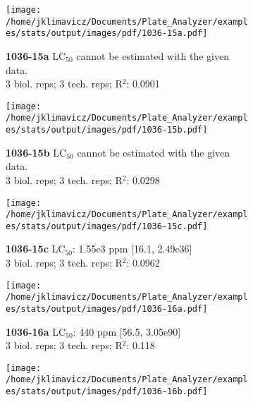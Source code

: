\documentclass{article}
\author{James Klimavicz}
\date{\today}
\begin{document}
\begin{figure}[thp!]
   \begin{subfigure}{0.500\textwidth}
      \centering
      \texttt{[image: /home/jklimavicz/Documents/Plate\_Analyzer/examples/stats/output/images/pdf/1036-15a.pdf]}
      \vspace{-0.05cm}
      \caption*{\textbf{1036-15a} LC$_{50}$ cannot be estimated with the given data. \\ 
3 biol. reps; 3 tech. reps; R$^2$: 0.0901}
      \vspace{0.1cm}
   \end{subfigure}%
   \begin{subfigure}{0.500\textwidth}
      \centering
      \texttt{[image: /home/jklimavicz/Documents/Plate\_Analyzer/examples/stats/output/images/pdf/1036-15b.pdf]}
      \vspace{-0.05cm}
      \caption*{\textbf{1036-15b} LC$_{50}$ cannot be estimated with the given data. \\ 
3 biol. reps; 3 tech. reps; R$^2$: 0.0298}
      \vspace{0.1cm}
   \end{subfigure}%
\vspace{-0.1cm}
   \begin{subfigure}{0.500\textwidth}
      \centering
      \texttt{[image: /home/jklimavicz/Documents/Plate\_Analyzer/examples/stats/output/images/pdf/1036-15c.pdf]}
      \vspace{-0.05cm}
      \caption*{\textbf{1036-15c} LC$_{50}$: 1.55e3 ppm [16.1, 2.49e36] \\ 
3 biol. reps; 3 tech. reps; R$^2$: 0.0962}
      \vspace{0.1cm}
   \end{subfigure}%
   \begin{subfigure}{0.500\textwidth}
      \centering
      \texttt{[image: /home/jklimavicz/Documents/Plate\_Analyzer/examples/stats/output/images/pdf/1036-16a.pdf]}
      \vspace{-0.05cm}
      \caption*{\textbf{1036-16a} LC$_{50}$: 440 ppm [56.5, 3.05e90] \\ 
3 biol. reps; 3 tech. reps; R$^2$: 0.118}
      \vspace{0.1cm}
   \end{subfigure}%
\vspace{-0.1cm}
   \begin{subfigure}{0.500\textwidth}
      \centering
      \texttt{[image: /home/jklimavicz/Documents/Plate\_Analyzer/examples/stats/output/images/pdf/1036-16b.pdf]}

\end{subfigure}
\end{figure}
\end{document}
